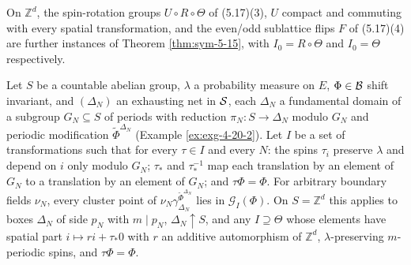 \begin{remark}[Georgii (5.17)(3)--(4), (5.20)(3)]
    \label{rmk:sym-5-20-others}

    On $\mathbb{Z}^d$, the spin-rotation groups $U \circ R \circ \Theta$ of (5.17)(3), $U$
    compact and commuting with every spatial transformation, and the even/odd sublattice flips
    $F$ of (5.17)(4) are further instances of Theorem \ref{thm:sym-5-15}, with
    $I_0 = R \circ \Theta$ and $I_0 = \Theta$ respectively.
\end{remark}

\begin{theorem}
    \label{thm:sym-5-20-3}
    \leanok

    Let $S$ be a countable abelian group, $\lambda$ a probability measure on $E$,
    $\Phi \in \mathcal{B}$ shift invariant, and $(\Delta_N)$ an exhausting net in $\mathcal{S}$, each
    $\Delta_N$ a fundamental domain of a subgroup $G_N \subseteq S$ of periods with reduction
    $\pi_N : S \to \Delta_N$ modulo $G_N$ and periodic modification $\tilde\Phi^{\Delta_N}$
    (Example \ref{ex:exg-4-20-2}). Let $I$ be a set of transformations such that for every
    $\tau \in I$ and every $N$: the spins $\tau_i$ preserve $\lambda$ and depend on $i$ only
    modulo $G_N$; $\tau_*$ and $\tau_*^{-1}$ map each translation by an element of $G_N$ to a
    translation by an element of $G_N$; and $\tau\Phi = \Phi$. For arbitrary boundary fields
    $\nu_N$, every cluster point of $\nu_N \gamma^{\tilde\Phi^{\Delta_N}}_{\Delta_N}$ lies in
    $\mathcal{G}_I(\Phi)$. On $S = \mathbb{Z}^d$ this applies to boxes $\Delta_N$ of side
    $p_N$ with $m \mid p_N$, $\Delta_N \uparrow S$, and any $I \supseteq \Theta$ whose elements
    have spatial part $i \mapsto r i + \tau_* 0$ with $r$ an additive automorphism of
    $\mathbb{Z}^d$, $\lambda$-preserving $m$-periodic spins, and $\tau\Phi = \Phi$.
\end{theorem}
